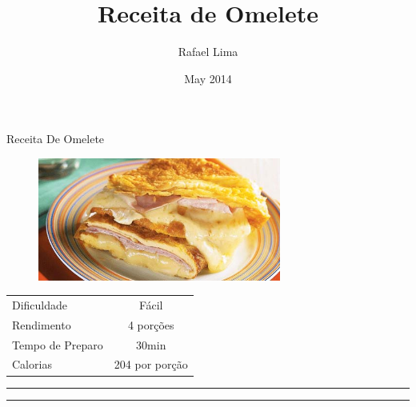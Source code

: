 \documentclass[landscape,twocolumn,a4]{article}
\title{Receita de Omelete}
\author{Rafael Lima}
\date{May 2014}
\begin{document}
\begin{center}Receita De Omelete\end{center}

\begin{figure}[H]
\centering
\includegraphics[width=8cm]{./img/receita-omelete-recheada}
\label{fig:my_label}
\end{figure}

\vspace{1cm}

\begin{table}[H]
\centering
\begin{tabular}{lc}
Dificuldade & Fácil\\
Rendimento & 4 porções\\
Tempo de Preparo & 30min\\
Calorias & 204 por porção\\
\end{tabular}
\end{table}

\newpage

\begin{center}
\color{laranjEu}
\rule{3cm}{1mm}\hspace{5mm}{
INGREDIENTES
}\hspace{5mm}\rule{3cm}{1mm}
\end{center}
\end{document}
